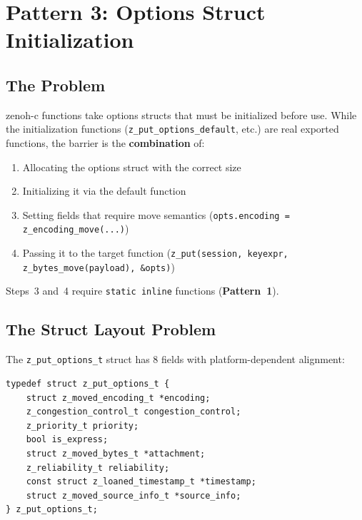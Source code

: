 \documentclass[11pt,a4paper]{article}
\newcommand{\code}[1]{\texttt{#1}}
\newcommand{\file}[1]{\texttt{#1}}
\newcommand{\fn}[1]{\texttt{#1}}
\newcommand{\type}[1]{\texttt{#1}}
\newcommand{\pattern}[1]{\textbf{Pattern~#1}}
\begin{document}
\section{Pattern 3: Options Struct Initialization}
\label{sec:pattern3}

\subsection{The Problem}

zenoh-c functions take options structs that must be initialized before use.
While the initialization functions (\fn{z\_put\_options\_default}, etc.) are
real exported functions, the barrier is the \textbf{combination} of:

\begin{enumerate}
  \item Allocating the options struct with the correct size
  \item Initializing it via the default function
  \item Setting fields that require move semantics
        (\code{opts.encoding = z\_encoding\_move(...)})
  \item Passing it to the target function
        (\code{z\_put(session, keyexpr, z\_bytes\_move(payload), \&opts)})
\end{enumerate}

Steps~3 and~4 require \code{static inline} functions (\pattern{1}).


\subsection{The Struct Layout Problem}

The \type{z\_put\_options\_t} struct has 8 fields with platform-dependent
alignment:

\begin{lstlisting}[style=cstyle,caption={\type{z\_put\_options\_t} layout from \file{zenoh\_commons.h}}]
typedef struct z_put_options_t {
    struct z_moved_encoding_t *encoding;
    z_congestion_control_t congestion_control;
    z_priority_t priority;
    bool is_express;
    struct z_moved_bytes_t *attachment;
    z_reliability_t reliability;
    const struct z_loaned_timestamp_t *timestamp;
    struct z_moved_source_info_t *source_info;
} z_put_options_t;
\end{lstlisting}
\end{document}
